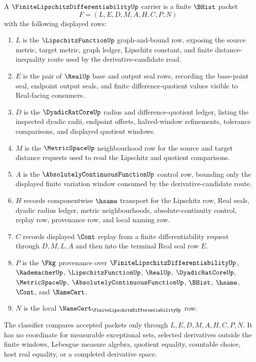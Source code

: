 \begin{definition}
\label{def:finite-lipschitz-differentiability-carrier}
A $\FiniteLipschitzDifferentiabilityUp$ carrier is a finite $\BHist$ packet
$$
F=(L,E,D,M,A,H,C,P,N)
$$
with the following displayed rows:
\begin{enumerate}
\item $L$ is the $\LipschitzFunctionUp$ graph-and-bound row, exposing the source metric, target metric, graph ledger, Lipschitz constant, and finite distance-inequality route used by the derivative-candidate read.
\item $E$ is the pair of $\RealUp$ base and output seal rows, recording the base-point seal, endpoint output seals, and finite difference-quotient values visible to Real-facing consumers.
\item $D$ is the $\DyadicRatCoreUp$ radius and difference-quotient ledger, listing the inspected dyadic radii, endpoint offsets, halved-window refinements, tolerance comparisons, and displayed quotient windows.
\item $M$ is the $\MetricSpaceUp$ neighbourhood row for the source and target distance requests used to read the Lipschitz and quotient comparisons.
\item $A$ is the $\AbsolutelyContinuousFunctionUp$ control row, bounding only the displayed finite variation window consumed by the derivative-candidate route.
\item $H$ records componentwise $\hsame$ transport for the Lipschitz row, Real seals, dyadic radius ledger, metric neighbourhoods, absolute-continuity control, replay row, provenance row, and local naming row.
\item $C$ records displayed $\Cont$ replay from a finite differentiability request through $D,M,L,A$ and then into the terminal Real seal row $E$.
\item $P$ is the $\Pkg$ provenance over $\FiniteLipschitzDifferentiabilityUp$, $\RademacherUp$, $\LipschitzFunctionUp$, $\RealUp$, $\DyadicRatCoreUp$, $\MetricSpaceUp$, $\AbsolutelyContinuousFunctionUp$, $\BHist$, $\hsame$, $\Cont$, and $\NameCert$.
\item $N$ is the local $\NameCert_{\FiniteLipschitzDifferentiabilityUp}$ row.
\end{enumerate}
The classifier compares accepted packets only through $L,E,D,M,A,H,C,P,N$. It has no coordinate for measurable exceptional sets, selected derivatives outside the finite windows, Lebesgue measure algebra, quotient equality, countable choice, host real equality, or a completed derivative space.
\end{definition}

